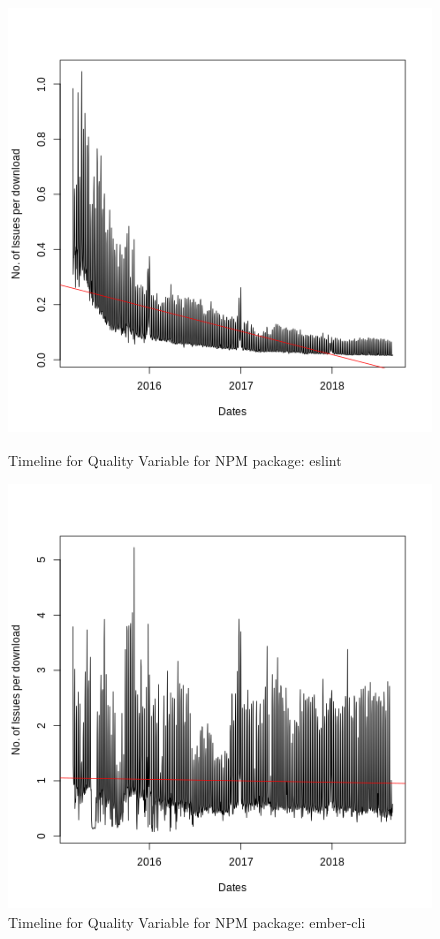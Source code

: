 \documentclass[smallextended]{svjour3}       %
\begin{document}
\begin{figure}[!t]
\begin{minipage}{.45\textwidth}
\centering
\includegraphics[width=\linewidth]{eslint}
\caption{Timeline for Quality Variable for NPM package: eslint}
\label{fig:tNe}
\end{minipage}
\hfill
\begin{minipage}{.45\textwidth}
\centering
\includegraphics[width=\linewidth]{ember-cli}
\caption{Timeline for Quality Variable for NPM package: ember-cli}
\label{fig:tNe}
\end{minipage}
\vspace{-10pt}
\end{figure}
\end{document}
